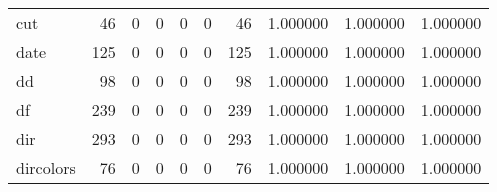 \begin{tabular}{lrrrrrrrrr}
cut       &                                        46 &                                                  0 &                                                  0 &                                                  0 &                                                  0 &                                                 46 &                                           1.000000 &                               1.000000 &                             1.000000 \\
date      &                                       125 &                                                  0 &                                                  0 &                                                  0 &                                                  0 &                                                125 &                                           1.000000 &                               1.000000 &                             1.000000 \\
dd        &                                        98 &                                                  0 &                                                  0 &                                                  0 &                                                  0 &                                                 98 &                                           1.000000 &                               1.000000 &                             1.000000 \\
df        &                                       239 &                                                  0 &                                                  0 &                                                  0 &                                                  0 &                                                239 &                                           1.000000 &                               1.000000 &                             1.000000 \\
dir       &                                       293 &                                                  0 &                                                  0 &                                                  0 &                                                  0 &                                                293 &                                           1.000000 &                               1.000000 &                             1.000000 \\
dircolors &                                        76 &                                                  0 &                                                  0 &                                                  0 &                                                  0 &                                                 76 &                                           1.000000 &                               1.000000 &                             1.000000 \\

\end{tabular}
